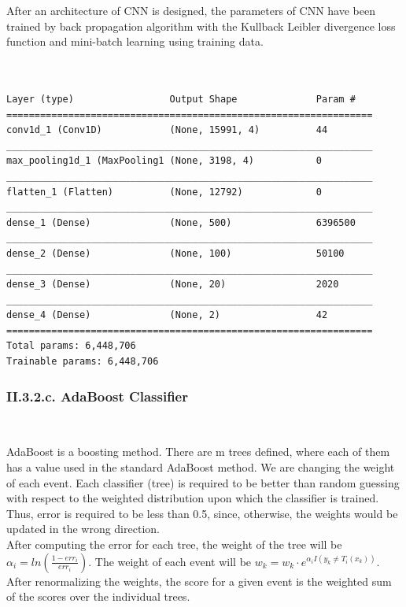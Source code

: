 \documentclass[11pt, a4papper]{report}
\theoremstyle{plain}
\theoremstyle{definition}
\theoremstyle{definition}
\theoremstyle{proposition}
\begin{document}
After an architecture of CNN is designed, the parameters of CNN have been trained by back propagation algorithm with the Kullback Leibler divergence loss function and mini-batch learning using training data.
\\
\
\\
\
\\

\begin{verbatim}
Layer (type)                 Output Shape              Param #   
=================================================================
conv1d_1 (Conv1D)            (None, 15991, 4)          44        
_________________________________________________________________
max_pooling1d_1 (MaxPooling1 (None, 3198, 4)           0         
_________________________________________________________________
flatten_1 (Flatten)          (None, 12792)             0         
_________________________________________________________________
dense_1 (Dense)              (None, 500)               6396500   
_________________________________________________________________
dense_2 (Dense)              (None, 100)               50100     
_________________________________________________________________
dense_3 (Dense)              (None, 20)                2020      
_________________________________________________________________
dense_4 (Dense)              (None, 2)                 42        
=================================================================
Total params: 6,448,706
Trainable params: 6,448,706

\end{verbatim}


\subsubsection*{II.3.2.c. AdaBoost Classifier}

\

AdaBoost is a boosting method. There are m trees defined, where each of them has a value used in the standard AdaBoost method. We are changing the weight of each event. Each classifier (tree) is required to be better than random guessing with respect to the weighted distribution upon which the classifier is trained. Thus, error is required to be less than 0.5, since, otherwise, the weights would be updated in the wrong direction. 
\\

After computing the error for each tree, the weight of the tree will be $\alpha_i = ln(\frac{1-err_i}{err_i})$. The weight of each event will be $w_k = w_k \cdot e^{\alpha_i I(y_k \neq T_i(x_k))}$. After renormalizing the weights, the score for a given event is the weighted sum of the scores over the individual trees.
\\
\end{document}
